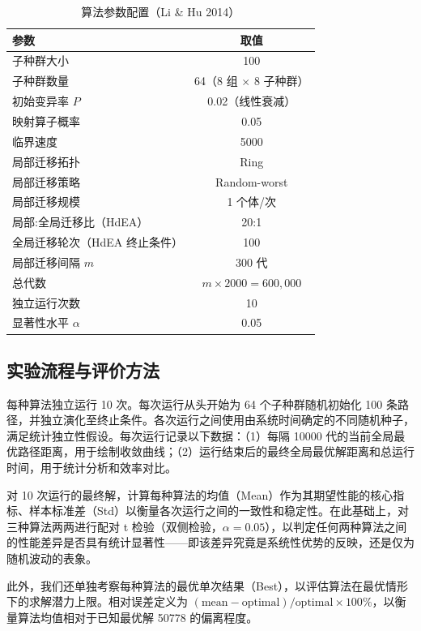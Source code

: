 \begin{table}[H]
\centering
\caption{算法参数配置（Li \& Hu 2014）}
\label{tab:params}
\begin{tabular}{lc}
\toprule
参数 & 取值 \\
\midrule
子种群大小 & 100 \\
子种群数量 & 64（8 组 $\times$ 8 子种群） \\
初始变异率 $P$ & 0.02（线性衰减） \\
映射算子概率 & 0.05 \\
临界速度 & 5000 \\
局部迁移拓扑 & Ring \\
局部迁移策略 & Random-worst \\
局部迁移规模 & 1 个体/次 \\
局部:全局迁移比（HdEA） & 20:1 \\
全局迁移轮次（HdEA 终止条件） & 100 \\
局部迁移间隔 $m$ & 300 代 \\
总代数 & $m \times 2000 = 600,000$ \\
独立运行次数 & 10 \\
显著性水平 $\alpha$ & 0.05 \\
\bottomrule
\end{tabular}
\end{table}

\subsection{实验流程与评价方法}

每种算法独立运行 10 次。每次运行从头开始为 64 个子种群随机初始化 100 条路径，并独立演化至终止条件。各次运行之间使用由系统时间确定的不同随机种子，满足统计独立性假设。每次运行记录以下数据：（1）每隔 10000 代的当前全局最优路径距离，用于绘制收敛曲线；（2）运行结束后的最终全局最优解距离和总运行时间，用于统计分析和效率对比。

对 10 次运行的最终解，计算每种算法的均值（Mean）作为其期望性能的核心指标、样本标准差（Std）以衡量各次运行之间的一致性和稳定性。在此基础上，对三种算法两两进行配对 t 检验（双侧检验，$\alpha=0.05$），以判定任何两种算法之间的性能差异是否具有统计显著性——即该差异究竟是系统性优势的反映，还是仅为随机波动的表象。

此外，我们还单独考察每种算法的最优单次结果（Best），以评估算法在最优情形下的求解潜力上限。相对误差定义为 $(\text{mean} - \text{optimal}) / \text{optimal} \times 100\%$，以衡量算法均值相对于已知最优解 50778 的偏离程度。
